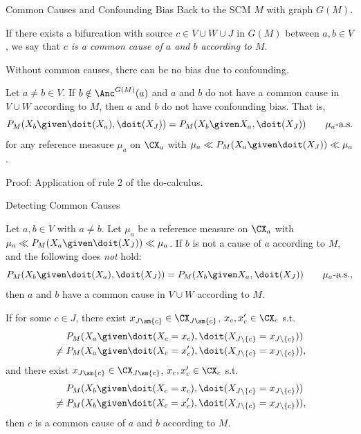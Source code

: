 \begin{frame}{Common Causes and Confounding Bias}
Back to the SCM $M$ with graph $G(M)$.
\begin{Def}[\ref{def:common_cause_of}]
  If there exists a bifurcation with source $c \in V \cup W \cup J$ in $G(M)$ between $a,b \in V$, we say that \emph{$c$ is a common cause of $a$ and $b$ according to $M$}.
\end{Def}
Without common causes, there can be no bias due to confounding.
\begin{Prp}[\ref{prp:scm_confounded_separation}]
Let $a \ne b \in V$.
If $b \notin \Anc^{G(M)}(a)$ and $a$ and $b$ do not have a common cause in $V \cup W$ according to $M$, then
$a$ and $b$ do not have confounding bias. That is,
  $$P_{M}(X_b \given \doit(X_a), \doit(X_J)) = P_{M}(X_b \given X_a, \doit(X_J)) \qquad \mu_a\text{-a.s.}$$
for any reference measure $\mu_a$ on $\CX_a$ with $\mu_a \ll P_M(X_a \given \doit(X_J)) \ll \mu_a$.
\end{Prp}
Proof: Application of rule 2 of the do-calculus.
\end{frame}

\begin{frame}{Detecting Common Causes}
\begin{Cor}[\ref{cor:scm_identify_confounder}]
\setlength\abovedisplayskip{5pt}
\setlength\belowdisplayskip{5pt}
Let $a, b \in V$ with $a \ne b$.
Let $\mu_a$ be a reference measure on $\CX_a$ with $\mu_a \ll P_M(X_a \given \doit(X_J)) \ll \mu_a$.
If $b$ is not a cause of $a$ according to $M$, and the following does \emph{not} hold:
  $$P_{M}(X_b \given \doit(X_a), \doit(X_J)) = P_{M}(X_b \given X_a, \doit(X_J)) \qquad \mu_a\text{-a.s.},$$
then $a$ and $b$ have a common cause in $V \cup W$ according to $M$.

If for some $c \in J$, 
there exist $x_{J\sm\{c\}} \in \CX_{J\sm\{c\}}$, $x_c,x_c' \in \CX_c$ s.t.
  \begin{equation*}\begin{split}
        & P_{M}(X_a \given \doit(X_c=x_c),\doit(X_{J\setminus \{c\}}=x_{J\setminus \{c\}})) \\
        {} \ne {} & P_{M}(X_a \given \doit(X_c=x_c'),\doit(X_{J\setminus\{c\}}=x_{J\setminus\{c\}})),
  \end{split}\end{equation*}
and there exist $x_{J\sm\{c\}} \in \CX_{J\sm\{c\}}$, $x_c,x_c' \in \CX_c$ s.t.
      \begin{equation*}\begin{split}
        & P_{M}(X_b \given \doit(X_c=x_c),\doit(X_{J\setminus \{c\}}=x_{J\setminus \{c\}})) \\
        {} \ne {} & P_{M}(X_b \given \doit(X_c=x_c'),\doit(X_{J\setminus\{c\}}=x_{J\setminus\{c\}})),
      \end{split}\end{equation*}
then $c$ is a common cause of $a$ and $b$ according to $M$.
\end{Cor}
\end{frame}

